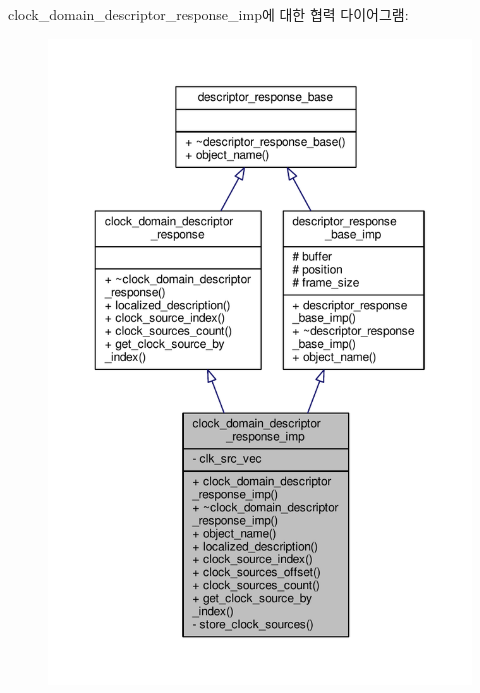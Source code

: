 clock\+\_\+domain\+\_\+descriptor\+\_\+response\+\_\+imp에 대한 협력 다이어그램\+:
\nopagebreak
\begin{figure}[H]
\begin{center}
\leavevmode
\includegraphics[width=350pt]{classavdecc__lib_1_1clock__domain__descriptor__response__imp__coll__graph}
\end{center}
\end{figure}
